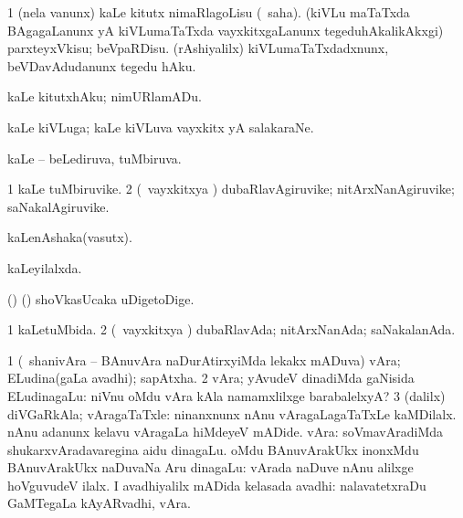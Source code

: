 \bentry
{} 
\gl{\sakirx}
\expl{}
\bmng
\bnum
\num{1} (nela \mo vanunx) kaLe kitutx nimaRlagoLisu (\rUpa\ saha). 
\banum
{} (kiVLu maTaTxda BAgagaLanunx yA kiVLumaTaTxda vayxkitxgaLanunx tegeduhAkalikAkxgi) parxteyxVkisu; beVpaRDisu. 
 (rAshiyalilx) kiVLumaTaTxdadxnunx, beVDavAdudanunx tegedu hAku. 
\eanum
\numie
\enum
\emng

\noindent 
\gl{\akirx}
\expl{}
\bmng
kaLe kitutxhAku; nimURlamADu. 
\emng
\eentry

\bentry
{} 
\gl{\nA}
\expl{}
\bmng
kaLe kiVLuga; kaLe kiVLuva vayxkitx yA salakaraNe. 
\emng
\eentry

\bentry
{} 
\gl{\gu}
\expl{}
\bmng
kaLe -- beLediruva, tuMbiruva. 
\emng
\eentry

\bentry
{} 
\gl{\nA}
\expl{}
\bmng
\bnum
\num{1} kaLe tuMbiruvike. 
\num{2} (\kanmu\ vayxkitxya \vi) dubaRlavAgiruvike; nitArxNanAgiruvike; saNakalAgiruvike. 
\enum
\emng
\eentry

\bentry
{} 
\gl{\nA}
\expl{}
\bmng
kaLenAshaka(vasutx). 
\emng
\eentry

\bentry
{} 
\gl{\gu}
\expl{}
\bmng
kaLeyilalxda. 
\emng
\eentry

\bentry
{} 
\gl{\nA}
\expl{}
\bmng
(\bava) (\pArxparx) shoVkasUcaka uDigetoDige. 
\emng
\eentry

\bentry
{} 
\gl{\gu}
\bmng
\bnum
\num{1} kaLetuMbida. 
\num{2} (\kanmu\ vayxkitxya \vi) dubaRlavAda; nitArxNanAda; saNakalanAda. 
\enum
\emng
\eentry

\bentry
{} 
\gl{\nA}
\expl{}
\bmng
\bnum
\num{1} (\sA\ shanivAra -- BAnuvAra naDurAtirxyiMda lekakx mADuva) vAra; ELudina(gaLa avadhi); sapAtxha. 
\num{2} vAra; yAvudeV dinadiMda gaNisida ELudinagaLu:  niVnu oMdu vAra kAla namamxlilxge barabalelxyA? 
\num{3} (\bava dalilx) diVGaRkAla; vAragaTaTxle:  ninanxnunx nAnu vAragaLagaTaTxLe kaMDilalx.  nAnu adanunx kelavu vAragaLa hiMdeyeV mADide. 
 vAra: 
\banum
{} soVmavAradiMda shukarxvAradavaregina aidu dinagaLu. 
 oMdu BAnuvArakUkx inonxMdu BAnuvArakUkx naDuvaNa Aru dinagaLu:  vArada naDuve nAnu alilxge hoVguvudeV ilalx. 
 I avadhiyalilx mADida kelasada avadhi:  nalavatetxraDu GaMTegaLa kAyARvadhi, vAra. 
\eanum
\numie
\enum
\emng

